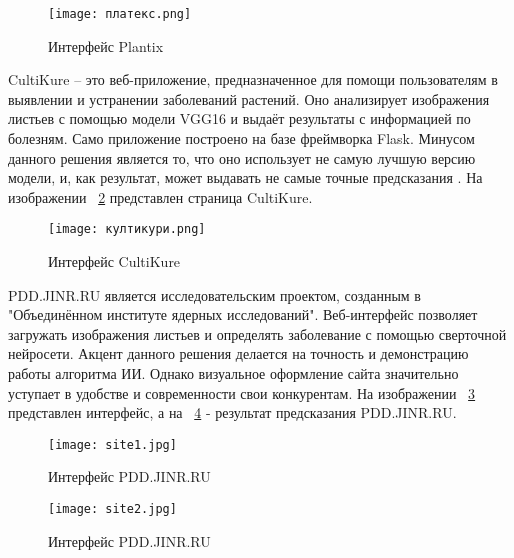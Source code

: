 \begin{figure}[ht]
	\centering
	\texttt{[image: платекс.png]}
	\caption{Интерфейс Plantix}
	\label{templ:image13}
\end{figure}

CultiKure -- это веб-приложение, предназначенное для помощи пользователям в выявлении и устранении заболеваний растений. Оно анализирует изображения листьев с помощью модели VGG16 и выдаёт результаты с информацией по болезням. Само приложение построено на базе фреймворка Flask. Минусом данного решения является то, что оно использует не самую лучшую версию модели, и, как результат, может выдавать не самые точные предсказания \cite{cn1}.
На изображении ~\ref{templ:image14} представлен страница CultiKure.

\begin{figure}[H]
	\texttt{[image: култикури.png]}
	\caption{Интерфейс CultiKure}
	\label{templ:image14}
\end{figure}

PDD.JINR.RU является исследовательским проектом, созданным в "Объединённом институте ядерных исследований". Веб-интерфейс позволяет загружать изображения листьев и определять заболевание с помощью сверточной нейросети. Акцент данного решения делается на точность и демонстрацию работы алгоритма ИИ. Однако визуальное оформление сайта значительно уступает в удобстве и современности свои конкурентам. На изображении ~\ref{templ:image15} представлен интерфейс, а на ~\ref{templ:image16} - результат предсказания PDD.JINR.RU.

\begin{figure}[H]
	\texttt{[image: site1.jpg]}
	\caption{Интерфейс PDD.JINR.RU}
	\label{templ:image15}
\end{figure}


\begin{figure}[H]
	\texttt{[image: site2.jpg]}
	\caption{Интерфейс PDD.JINR.RU}
	\label{templ:image16}
\end{figure}


